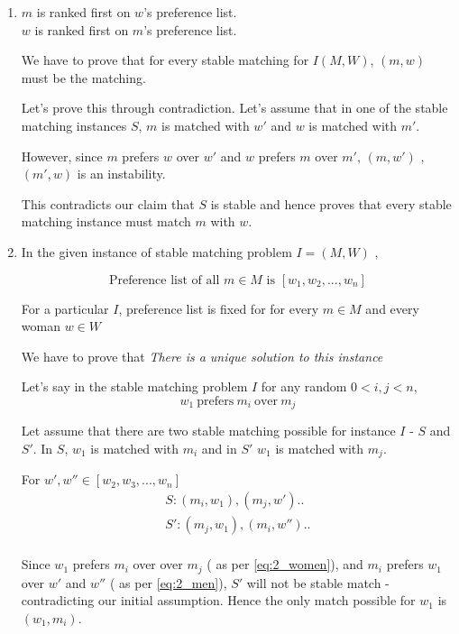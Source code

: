 \documentclass{homeworg}
\begin{document}
\exercise
\begin{enumerate}[label=\alph*)]
\item 
$m$ is ranked first on $w$'s preference list.\\
$w$ is ranked first on $m$'s preference list.

We have to prove that for every stable matching for $I(M,W)$, $(m,w)$ must be the matching.

Let's prove this through contradiction. Let's assume that in one of the stable matching instances $S$, $m$ is matched with $w'$  and $w$ is matched with $m'$.

However, since $m$ prefers $w$ over $w'$ and $w$ prefers $m$ over $m'$, $(m,w')$ , $(m',w)$ is an instability.

This contradicts our claim that $S$ is stable and hence proves that every stable matching instance must match $m$ with $w$.

\item In the given instance of stable matching problem $I =(M,W)$ ,

\begin{equation}
\label{eq:2_men}
\text{Preference list of all } m \in M \text{ is } [w_1,w_2,. .., w_n]
\end{equation}

For a particular $I$, preference list is fixed for for every $m \in M$ and every woman $w \in W$ 

We have to prove that \emph{There is a unique solution to this instance}

Let's say in the stable matching problem $I$ for any random $0 <i, j <n$, 
\begin{equation}
\label{eq:2_women}
w_1\ \text{prefers}\ m_i\ \text{over}\ m_j
\end{equation}



Let assume that there are two stable matching possible for instance $I$ - $S$ and $S'$.  In $S$, $w_1$ is matched with $m_i$ and in $S'$ $w_1$ is matched with $m_j$.

For $w', w'' \in [w_2,w_3,. .., w_n]$
\begin{align*}
    S : (m_i,w_1),(m_j,w') ..\\
    S' : (m_j,w_1),(m_i,w'') ..\\
\end{align*}

Since $w_1$ prefers $m_i$ over over $m_j$ ( as per \ref{eq:2_women}), and $m_i$  prefers $w_1$ over $w'$ and $w''$ ( as per \ref{eq:2_men}), $S'$ will not be stable match - contradicting our initial assumption. Hence the only match possible for $w_1$ is $(w_1,m_i)$.


\end{enumerate}
\end{document}

